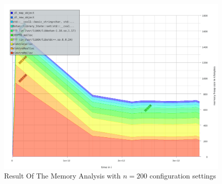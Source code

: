 \begin{figure}[h]
\center
\caption{Result Of The Memory Analysis with $n = 200$ configuration settings}
\label{eval-massif-200}
\includegraphics[width=\columnwidth]{plots/massif_200.pdf}
\end{figure}



%
%
%
%
%
%
%
%
%


